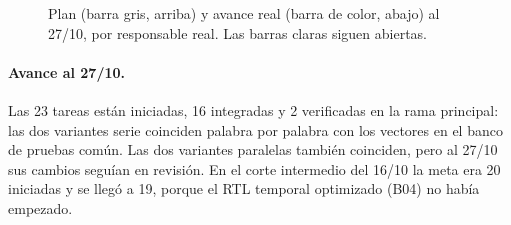 \begin{figure}[h]
  \centering
  
  \caption{Plan (barra gris, arriba) y avance real (barra de color, abajo) al 27/10, por responsable real. Las barras claras siguen abiertas.}\label{fig:gantt}
\end{figure}

\paragraph{Avance al 27/10.} Las 23 tareas están iniciadas, 16 integradas y 2 verificadas en la rama principal: las dos variantes serie coinciden palabra por palabra con los vectores en el banco de pruebas común. Las dos variantes paralelas también coinciden, pero al 27/10 sus cambios seguían en revisión. En el corte intermedio del 16/10 la meta era 20 iniciadas y se llegó a 19, porque el RTL temporal optimizado (B04) no había empezado.

